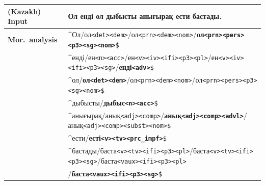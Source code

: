 \documentclass[11pt]{article}
\newcommand{\tag}[1]{{\small{\texttt{#1}}}}
\begin{document}
\begin{table}[htbp]
\centering
\begin{tabular}{ll}
\toprule
{\bf (Kazakh) Input} & Ол енді ол дыбысты анығырақ ести бастады. \\
\midrule
{\bf Mor.\ analysis} & \^{}Ол/ол\tag{<det>}\tag{<dem>}/ол\tag{<prn>}\tag{<dem>}\tag{<nom>}/\textbf{ол\tag{<prn>}\tag{<pers>}\tag{<p3>}\tag{<sg>}\tag{<nom>}}\tag{\$} \\
                     & \^{}енді/ен\tag{<n>}\tag{<acc>}/ен\tag{<v>}\tag{<iv>}\tag{<ifi>}\tag{<p3>}\tag{<pl>}/ен\tag{<v>}\tag{<iv>}\tag{<ifi>}\tag{<p3>}\tag{<sg>}/\textbf{енді\tag{<adv>}}\tag{\$}  \\
							& \^{}ол/\textbf{ол\tag{<det>}\tag{<dem>}}/ол\tag{<prn>}\tag{<dem>}\tag{<nom>}/ол\tag{<prn>}\tag{<pers>}\tag{<p3>}\tag{<sg>}\tag{<nom>}\tag{\$} \\
                     & \^{}дыбысты/\textbf{дыбыс\tag{<n>}\tag{<acc>}}\tag{\$} \\
							& \^{}анығырақ/анық\tag{<adj>}\tag{<comp>}/\textbf{анық\tag{<adj>}\tag{<comp>}\tag{<advl>}}/анық\tag{<adj>}\tag{<comp>}\tag{<subst>}\tag{<nom>}\tag{\$} \\
                     & \^{}ести/\textbf{есті\tag{<v>}\tag{<tv>}\tag{<prc\_impf>}}\tag{\$}  \\
                     & \^{}бастады/баста\tag{<v>}\tag{<tv>}\tag{<ifi>}\tag{<p3>}\tag{<pl>}/баста\tag{<v>}\tag{<tv>}\tag{<ifi>}\tag{<p3>}\tag{<sg>}/баста\tag{<vaux>}\tag{<ifi>}\tag{<p3>}\tag{<pl>} \\
                     & \hspace{2em}/\textbf{баста\tag{<vaux>}\tag{<ifi>}\tag{<p3>}\tag{<sg>}}\tag{\$}  \\

\end{tabular}
\end{table}
\end{document}
